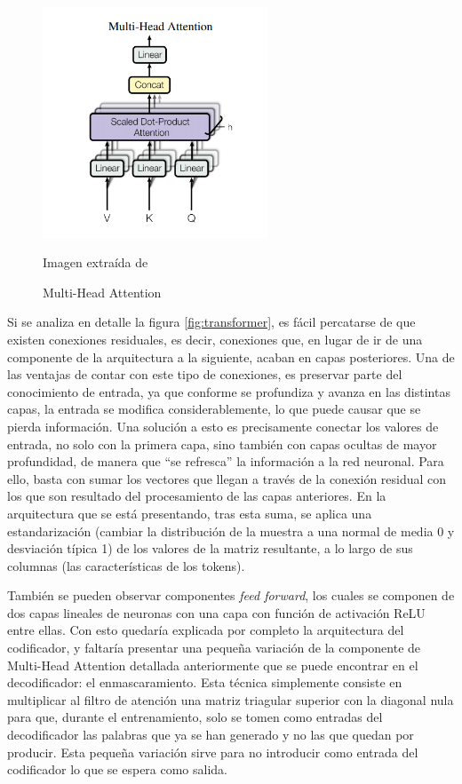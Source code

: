 \begin{figure}[h]
	\centering%
	\centerline{\includegraphics[width = 0.6\textwidth]{Imagenes/Bitmap/multi-head-attention.png}}%
	\caption{Multi-Head Attention}%
	Imagen extraída de \cite{transformers}
	\label{fig:multiattention}
\end{figure}

Si se analiza en detalle la figura \ref{fig:transformer}, es fácil percatarse de que existen conexiones residuales, es decir, conexiones que, en lugar de ir de una componente de la arquitectura a la siguiente, acaban en capas posteriores. Una de las ventajas de contar con este tipo de conexiones, es preservar parte del conocimiento de entrada, ya que conforme se profundiza y avanza en las distintas capas, la entrada se modifica considerablemente, lo que puede causar que se pierda información. Una solución a esto es precisamente conectar los valores de entrada, no solo con la primera capa, sino también con capas ocultas de mayor profundidad, de manera que ``se refresca'' la información a la red neuronal. Para ello, basta con sumar los vectores que llegan a través de la conexión residual con los que son resultado del procesamiento de las capas anteriores. En la arquitectura que se está presentando, tras esta suma, se aplica una estandarización (cambiar la distribución de la muestra a una normal de media 0 y desviación típica 1) de los valores de la matriz resultante, a lo largo de sus columnas (las características de los tokens).

También se pueden observar componentes \textit{feed forward}, los cuales se componen de dos capas lineales de neuronas con una capa con función de activación ReLU entre ellas. Con esto quedaría explicada por completo la arquitectura del codificador, y faltaría presentar una pequeña variación de la componente de Multi-Head Attention detallada anteriormente que se puede encontrar en el decodificador: el enmascaramiento. Esta técnica simplemente consiste en multiplicar al filtro de atención una matriz triagular superior con la diagonal nula para que, durante el entrenamiento, solo se tomen como entradas del decodificador las palabras que ya se han generado y no las que quedan por producir. Esta pequeña variación sirve para no introducir como entrada del codificador lo que se espera como salida.

